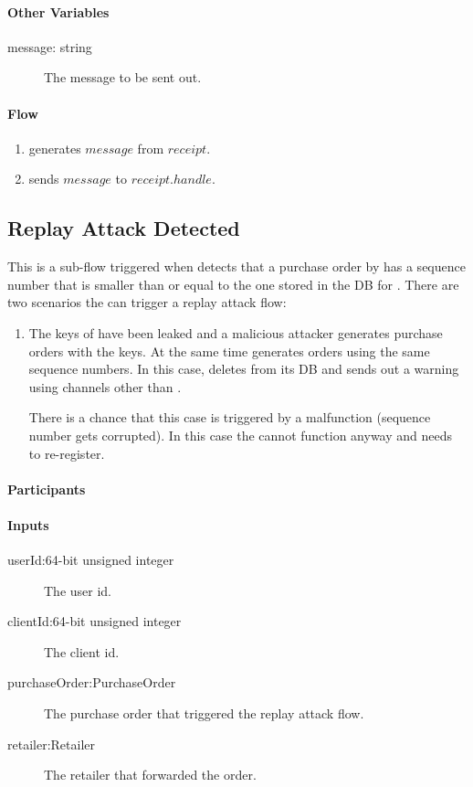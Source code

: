 \documentclass[a4paper,10pt,draft]{article}
\begin{document}
\paragraph{Other Variables}
\SpecialItem
\begin{description}
 \item[message: string] The message to be sent out.
\end{description}

\paragraph{Flow}

\begin{enumerate}
 \item \Server{} generates $message$ from $receipt$.
 \item \Server{} sends $message$ to $receipt.handle$.
\end{enumerate}

\subsection{Replay Attack Detected}
\label{replay_attack_flow}
This is a sub-flow triggered when \Server{} detects that a purchase order by 
\Client{} has a sequence number that is smaller than or equal to the one stored 
in the DB for \Client{}. There are two scenarios the can trigger a replay 
attack flow:

\begin{enumerate}
 \item The keys of \Client{} have been leaked and a malicious attacker 
generates purchase orders with the keys. At the same time \Client{} generates 
orders using the same sequence numbers. In this case, \Server{} deletes 
\Client{} from its DB and sends out a warning using channels other than 
\Client{}.

There is a chance that this case is triggered by a \Client{} malfunction 
(sequence number gets corrupted). In this case the \Client{} cannot function 
anyway and \User{} needs to re-register.
\end{enumerate}

\paragraph{Participants} \Server{}

\paragraph{Inputs}
\SpecialItem
\begin{description}
 \item[userId:64-bit unsigned integer] The user id.
 \item[clientId:64-bit unsigned integer] The client id.
 \item[purchaseOrder:PurchaseOrder] The purchase order that triggered the 
replay attack flow.
 \item[retailer:Retailer] The retailer that forwarded the order.
\end{description}
\end{document}
